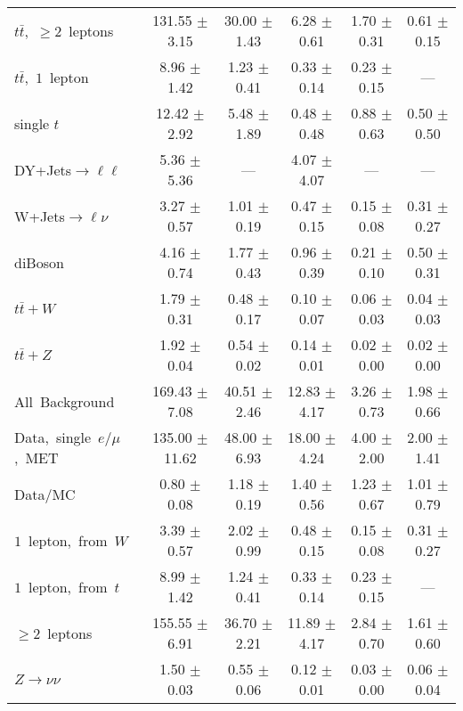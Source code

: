 \documentclass{article}
\begin{document}
\begin{longtable}{|l|c|c|c|c|c|}
$t\bar{t}$,~$\ge2$~leptons & 131.55 $\pm$ 3.15  & 30.00 $\pm$ 1.43  & 6.28 $\pm$ 0.61  & 1.70 $\pm$ 0.31  & 0.61 $\pm$ 0.15 \\* 
$t\bar{t}$,~$1$~lepton & 8.96 $\pm$ 1.42  & 1.23 $\pm$ 0.41  & 0.33 $\pm$ 0.14  & 0.23 $\pm$ 0.15  & --- \\* 
single $t$  & 12.42 $\pm$ 2.92  & 5.48 $\pm$ 1.89  & 0.48 $\pm$ 0.48  & 0.88 $\pm$ 0.63  & 0.50 $\pm$ 0.50 \\* 
DY+Jets$\rightarrow\ell\ell$  & 5.36 $\pm$ 5.36  & ---  & 4.07 $\pm$ 4.07  & ---  & --- \\* 
W+Jets$\rightarrow\ell\nu$  & 3.27 $\pm$ 0.57  & 1.01 $\pm$ 0.19  & 0.47 $\pm$ 0.15  & 0.15 $\pm$ 0.08  & 0.31 $\pm$ 0.27 \\* 
diBoson  & 4.16 $\pm$ 0.74  & 1.77 $\pm$ 0.43  & 0.96 $\pm$ 0.39  & 0.21 $\pm$ 0.10  & 0.50 $\pm$ 0.31 \\* 
$t\bar{t}+W$  & 1.79 $\pm$ 0.31  & 0.48 $\pm$ 0.17  & 0.10 $\pm$ 0.07  & 0.06 $\pm$ 0.03  & 0.04 $\pm$ 0.03 \\* 
$t\bar{t}+Z$  & 1.92 $\pm$ 0.04  & 0.54 $\pm$ 0.02  & 0.14 $\pm$ 0.01  & 0.02 $\pm$ 0.00  & 0.02 $\pm$ 0.00 \\* 
\hline \hline 
All~Background  & 169.43 $\pm$ 7.08  & 40.51 $\pm$ 2.46  & 12.83 $\pm$ 4.17  & 3.26 $\pm$ 0.73  & 1.98 $\pm$ 0.66 \\* 
Data,~single~$e/\mu$,~MET  & 135.00 $\pm$ 11.62  & 48.00 $\pm$ 6.93  & 18.00 $\pm$ 4.24  & 4.00 $\pm$ 2.00  & 2.00 $\pm$ 1.41 \\* 
Data/MC  & 0.80 $\pm$ 0.08  & 1.18 $\pm$ 0.19  & 1.40 $\pm$ 0.56  & 1.23 $\pm$ 0.67  & 1.01 $\pm$ 0.79 \\* 
\hline \hline 
$1$~lepton,~from~$W$  & 3.39 $\pm$ 0.57  & 2.02 $\pm$ 0.99  & 0.48 $\pm$ 0.15  & 0.15 $\pm$ 0.08  & 0.31 $\pm$ 0.27 \\* 
$1$~lepton,~from~$t$  & 8.99 $\pm$ 1.42  & 1.24 $\pm$ 0.41  & 0.33 $\pm$ 0.14  & 0.23 $\pm$ 0.15  & --- \\* 
$\ge2$~leptons  & 155.55 $\pm$ 6.91  & 36.70 $\pm$ 2.21  & 11.89 $\pm$ 4.17  & 2.84 $\pm$ 0.70  & 1.61 $\pm$ 0.60 \\* 
$Z\rightarrow\nu\nu$  & 1.50 $\pm$ 0.03  & 0.55 $\pm$ 0.06  & 0.12 $\pm$ 0.01  & 0.03 $\pm$ 0.00  & 0.06 $\pm$ 0.04 \\* 
\hline 
\end{longtable} 

 
 
 
 
\pagebreak 
\end{document}

